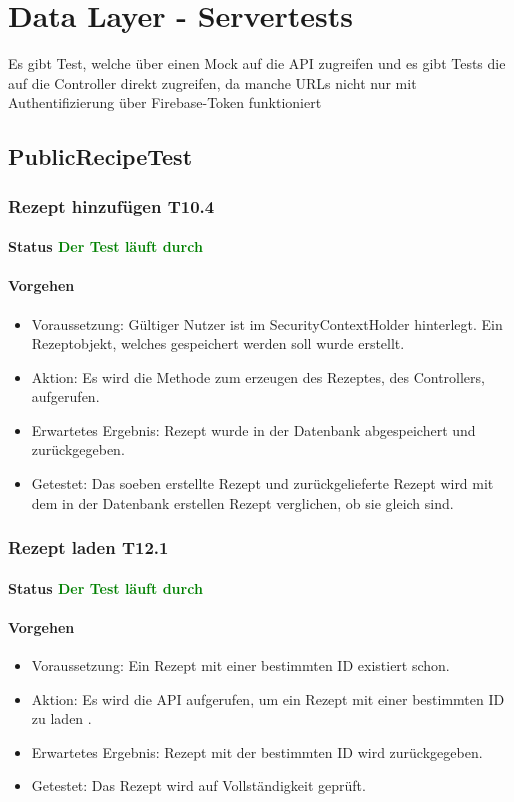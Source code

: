 \chapter{Data Layer - Servertests}
Es gibt Test, welche über einen Mock auf die API zugreifen und es gibt Tests die auf die Controller direkt zugreifen, da manche URLs nicht nur mit Authentifizierung über Firebase-Token funktioniert

\section{PublicRecipeTest}

\subsection{Rezept hinzufügen T10.4}
\subsubsection{Status \textcolor{green}{ Der Test läuft durch} }
\subsubsection{Vorgehen}
\begin{itemize}
	\item Voraussetzung: Gültiger Nutzer ist im SecurityContextHolder hinterlegt. Ein Rezeptobjekt, welches gespeichert werden soll wurde erstellt.
	\item Aktion: Es wird die Methode zum erzeugen des Rezeptes, des Controllers, aufgerufen.
	\item Erwartetes Ergebnis: Rezept wurde in der Datenbank abgespeichert und zurückgegeben.
	\item Getestet: Das soeben erstellte Rezept und zurückgelieferte Rezept wird mit dem in der Datenbank erstellen Rezept verglichen, ob sie gleich sind.
\end{itemize}

\subsection{Rezept laden T12.1}
\subsubsection{Status \textcolor{green}{ Der Test läuft durch} }
\subsubsection{Vorgehen}
\begin{itemize}
	\item Voraussetzung: Ein Rezept mit einer bestimmten ID existiert schon.
	\item Aktion: Es wird die API aufgerufen, um ein Rezept mit einer bestimmten ID zu laden .
	\item Erwartetes Ergebnis: Rezept mit der bestimmten ID wird zurückgegeben.
	\item Getestet: Das Rezept wird auf Vollständigkeit geprüft.
\end{itemize}

